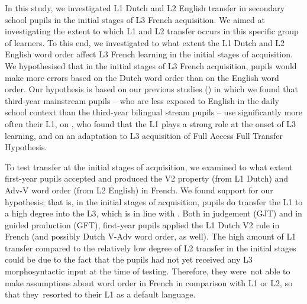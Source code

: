 \documentclass[output=paper,modfonts,nonflat, newtxmath]{langsci/langscibook}
\begin{document}
In this study, we investigated L1 Dutch and L2 English transfer in secondary school pupils in the initial stages of L3 French acquisition. We aimed at investigating the extent to which L1 and L2 transfer occurs in this specific group of learners. To this end, we investigated to what extent the L1 Dutch and L2 English word order affect L3 French learning in the initial stages of acquisition. We hypothesised that in the initial stages of L3 French acquisition, pupils would make more errors based on the Dutch word order than on the English word order. Our hypothesis is based on  our previous studies (\citealt{StadtEtAl2016, StadtEtAl2018Exposure}) in which we found that third-year mainstream pupils – who are less exposed to English in the daily school context than the third-year bilingual stream pupils – use significantly more often their L1, on  \citet{Hermas2010, Hermas2014Morphosyntax, Hermas2014Relatives}, who found that the L1 plays a strong role at the onset of L3 learning, and  on an adaptation to L3 acquisition of  Full Access Full Transfer Hypothesis.

  To test transfer at the initial stages of acquisition, we examined to what extent first-year pupils accepted and produced the V2 property (from L1 Dutch) and Adv-V word order (from L2 English) in French. We found support for our hypothesis; that is, in the initial stages of acquisition, pupils do transfer the L1 to a high degree into the L3, which is in line with \citet{Hermas2010, Hermas2014Morphosyntax, Hermas2014Relatives}. Both in judgement (GJT) and in guided production (GFT), first-year pupils applied the L1 Dutch V2 rule in French (and possibly Dutch V-Adv word order, as well). The high amount of L1 transfer compared to the relatively low degree of L2 transfer in the initial stages could be due to the fact that the pupils had not yet received any L3 morphosyntactic input at the time of testing. Therefore, they were~not able to make assumptions about word order in French in comparison with L1 or L2, so that they~resorted to their L1 as a default language.
\end{document}
